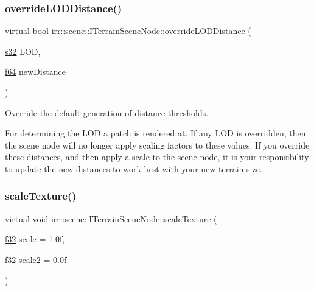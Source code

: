 \subsubsection{\texorpdfstring{override\+L\+O\+D\+Distance()}{overrideLODDistance()}}
{\footnotesize\ttfamily virtual bool irr\+::scene\+::\+I\+Terrain\+Scene\+Node\+::override\+L\+O\+D\+Distance (\begin{DoxyParamCaption}\item[{\hyperlink{namespaceirr_ac66849b7a6ed16e30ebede579f9b47c6}{s32}}]{L\+OD,  }\item[{\hyperlink{namespaceirr_a1325b02603ad449f92c68fc640af9b28}{f64}}]{new\+Distance }\end{DoxyParamCaption})\hspace{0.3cm}{\ttfamily [pure virtual]}}



Override the default generation of distance thresholds. 

For determining the L\+OD a patch is rendered at. If any L\+OD is overridden, then the scene node will no longer apply scaling factors to these values. If you override these distances, and then apply a scale to the scene node, it is your responsibility to update the new distances to work best with your new terrain size. \mbox{\label{classirr_1_1scene_1_1ITerrainSceneNode_aacfb35db09be74e32c22a10c7e13bbcc}} 
\subsubsection{\texorpdfstring{scale\+Texture()}{scaleTexture()}}
{\footnotesize\ttfamily virtual void irr\+::scene\+::\+I\+Terrain\+Scene\+Node\+::scale\+Texture (\begin{DoxyParamCaption}\item[{\hyperlink{namespaceirr_a0277be98d67dc26ff93b1a6a1d086b07}{f32}}]{scale = {\ttfamily 1.0f},  }\item[{\hyperlink{namespaceirr_a0277be98d67dc26ff93b1a6a1d086b07}{f32}}]{scale2 = {\ttfamily 0.0f} }\end{DoxyParamCaption})\hspace{0.3cm}{\ttfamily [pure virtual]}}



